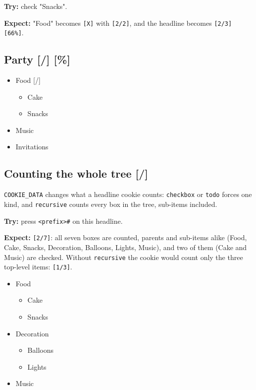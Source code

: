 \textbf{Try:} check "Snacks".

\textbf{Expect:} "Food" becomes \texttt{[X]} with \texttt{[2/2]}, and the headline becomes
\texttt{[2/3] [66\%]}.
\subsection{Party [/] [\%]}
\label{sec:org8242909}
\begin{itemize}
\item[{$\boxminus$}] Food [/]
\begin{itemize}
\item[{$\boxtimes$}] Cake
\item[{$\square$}] Snacks
\end{itemize}
\item[{$\boxtimes$}] Music
\item[{$\square$}] Invitations
\end{itemize}
\subsection{Counting the whole tree [/]}
\label{sec:orgde2857d}
\texttt{COOKIE\_DATA} changes what a headline cookie counts: \texttt{checkbox} or \texttt{todo}
forces one kind, and \texttt{recursive} counts every box in the tree, sub-items
included.

\textbf{Try:} press \texttt{<prefix>\#} on this headline.

\textbf{Expect:} \texttt{[2/7]}: all seven boxes are counted, parents and sub-items
alike (Food, Cake, Snacks, Decoration, Balloons, Lights, Music), and two of
them (Cake and Music) are checked. Without \texttt{recursive} the cookie would
count only the three top-level items: \texttt{[1/3]}.

\begin{itemize}
\item[{$\boxminus$}] Food
\begin{itemize}
\item[{$\boxtimes$}] Cake
\item[{$\square$}] Snacks
\end{itemize}
\item[{$\square$}] Decoration
\begin{itemize}
\item[{$\square$}] Balloons
\item[{$\square$}] Lights
\end{itemize}
\item[{$\boxtimes$}] Music
\end{itemize}

